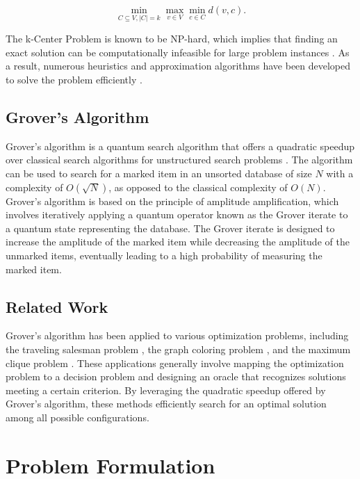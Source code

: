 \begin{equation}
\min_{C \subseteq V, |C| = k} \max_{v \in V} \min_{c \in C} d(v, c).
\end{equation}

The k-Center Problem is known to be NP-hard, which implies that finding an exact solution can be computationally infeasible for large problem instances \cite{kariv1979algorithm}. As a result, numerous heuristics and approximation algorithms have been developed to solve the problem efficiently \cite{gonzalez1985clustering, tushar2017recent}.

\subsection{Grover's Algorithm}
Grover's algorithm is a quantum search algorithm that offers a quadratic speedup over classical search algorithms for unstructured search problems \cite{grover1996fast}. The algorithm can be used to search for a marked item in an unsorted database of size $N$ with a complexity of $O(\sqrt{N})$, as opposed to the classical complexity of $O(N)$. Grover's algorithm is based on the principle of amplitude amplification, which involves iteratively applying a quantum operator known as the Grover iterate to a quantum state representing the database. The Grover iterate is designed to increase the amplitude of the marked item while decreasing the amplitude of the unmarked items, eventually leading to a high probability of measuring the marked item.

\subsection{Related Work}
Grover's algorithm has been applied to various optimization problems, including the traveling salesman problem \cite{zalka1999grover}, the graph coloring problem \cite{childs2000quantum}, and the maximum clique problem \cite{ambainis2003quantum}. These applications generally involve mapping the optimization problem to a decision problem and designing an oracle that recognizes solutions meeting a certain criterion. By leveraging the quadratic speedup offered by Grover's algorithm, these methods efficiently search for an optimal solution among all possible configurations.

\section{Problem Formulation}

